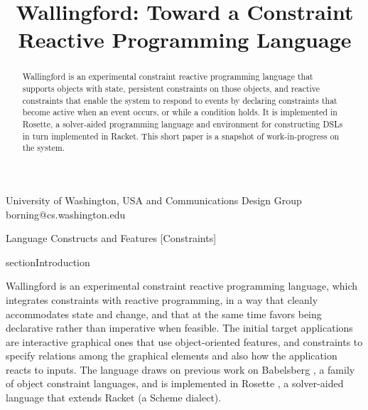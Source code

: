 \documentclass[reprint]{sigplanconf}
\begin{document}

\sloppy


\setlength{\pdfpageheight}{\paperheight}
\setlength{\pdfpagewidth}{\paperwidth}


\title{Wallingford: Toward a Constraint \\  Reactive Programming Language}

{University of Washington, USA and Communications Design Group}
{borning@cs.washington.edu}

\maketitle

\begin{abstract}
Wallingford is an experimental constraint reactive programming language
that supports objects with state, persistent constraints on those objects,
and reactive constraints that enable the system to respond to events by
declaring constraints that become active when an event occurs, or while a
condition holds.  It is implemented in Rosette, a solver-aided programming
language and environment for constructing DSLs in turn implemented in
Racket.  This short paper is a snapshot of work-in-progress on the system.

\end{abstract}

         {Language Constructs and Features}
         [Constraints]


section{Introduction}

Wallingford is an experimental constraint reactive programming
language, which integrates constraints with reactive programming, in a
way that cleanly accommodates state and change, and that at the same
time favors being declarative rather than imperative when feasible.
The initial target applications are interactive graphical ones that
use object-oriented features, and constraints to specify relations
among the graphical elements and also how the application reacts to
inputs.  The language draws on previous work on Babelsberg
\cite{FelgentreffJOT14,felgentreff-oopsla-2015}, a family of
object constraint languages, and is implemented in Rosette
\cite{torlak-onward-2013,torlak-pldi-2014}, a
solver-aided language that extends Racket (a Scheme dialect).
\end{document}
